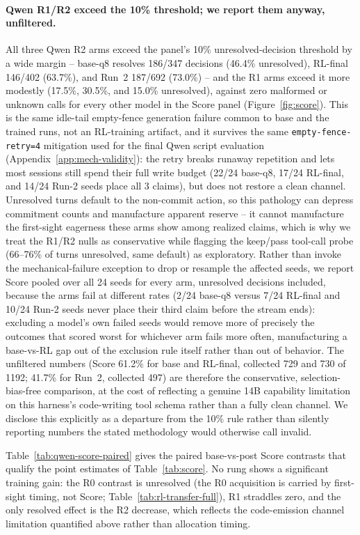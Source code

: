 \documentclass{article}
\begin{document}
\paragraph{Qwen R1/R2 exceed the 10\% threshold; we report them anyway, unfiltered.} All three Qwen R2 arms exceed the panel's 10\% unresolved-decision threshold by a wide margin -- base-q8 resolves 186/347 decisions (46.4\% unresolved), RL-final 146/402 (63.7\%), and Run~2 187/692 (73.0\%) -- and the R1 arms exceed it more modestly (17.5\%, 30.5\%, and 15.0\% unresolved), against zero malformed or unknown calls for every other model in the Score panel (Figure~\ref{fig:score}). This is the same idle-tail empty-fence generation failure common to base and the trained runs, not an RL-training artifact, and it survives the same \texttt{empty-fence-retry=4} mitigation used for the final Qwen script evaluation (Appendix~\ref{app:mech-validity}): the retry breaks runaway repetition and lets most sessions still spend their full write budget (22/24 base-q8, 17/24 RL-final, and 14/24 Run-2 seeds place all 3 claims), but does not restore a clean channel. Unresolved turns default to the non-commit action, so this pathology can depress commitment counts and manufacture apparent reserve -- it cannot manufacture the first-sight eagerness these arms show among realized claims, which is why we treat the R1/R2 nulls as conservative while flagging the keep/pass tool-call probe (66--76\% of turns unresolved, same default) as exploratory. Rather than invoke the mechanical-failure exception to drop or resample the affected seeds, we report Score pooled over all 24 seeds for every arm, unresolved decisions included, because the arms fail at different rates (2/24 base-q8 versus 7/24 RL-final and 10/24 Run-2 seeds never place their third claim before the stream ends): excluding a model's own failed seeds would remove more of precisely the outcomes that scored worst for whichever arm fails more often, manufacturing a base-vs-RL gap out of the exclusion rule itself rather than out of behavior. The unfiltered numbers (Score 61.2\% for base and RL-final, collected 729 and 730 of 1192; 41.7\% for Run~2, collected 497) are therefore the conservative, selection-bias-free comparison, at the cost of reflecting a genuine 14B capability limitation on this harness's code-writing tool schema rather than a fully clean channel. We disclose this explicitly as a departure from the 10\% rule rather than silently reporting numbers the stated methodology would otherwise call invalid.

Table~\ref{tab:qwen-score-paired} gives the paired base-vs-post Score contrasts that qualify the point estimates of Table~\ref{tab:score}. No rung shows a significant training gain: the R0 contrast is unresolved (the R0 acquisition is carried by first-sight timing, not Score; Table~\ref{tab:rl-transfer-full}), R1 straddles zero, and the only resolved effect is the R2 decrease, which reflects the code-emission channel limitation quantified above rather than allocation timing.
\end{document}
